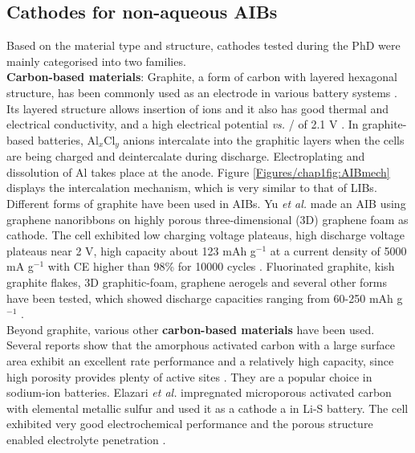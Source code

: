 \subsection{Cathodes for non-aqueous AIBs}
Based on the material type and structure, cathodes tested during the PhD were mainly categorised into two families.\\
\textbf{Carbon-based materials}: Graphite, a form of carbon with layered hexagonal structure, has been commonly used as an electrode in various battery systems \cite{xu_charge-transfer_2007, zhang_novel_2016, wu_carbon_2003, jian_carbon_2015}. Its layered structure allows insertion of ions and it also has good thermal and electrical conductivity, and a high electrical potential \textit{vs.} / of 2.1 V \cite{lin_ultrafast_2015}. In graphite-based batteries, Al$_x$Cl$_y$ anions intercalate into the graphitic layers when the cells are being charged and deintercalate during discharge. Electroplating and dissolution of Al takes place at the anode. Figure \ref{Figures/chap1fig:AIBmech} displays the intercalation mechanism, which is very similar to that of LIBs. Different forms of graphite have been used in AIBs. Yu \textit{et al.} made an AIB using graphene nanoribbons on highly porous three-dimensional (3D) graphene foam as cathode. The cell exhibited low charging voltage plateaus, high discharge voltage plateaus near 2 V, high capacity about 123 mAh g$^{-1}$ at a current density of 5000 mA g$^{-1}$ with CE higher than 98\% for 10000 cycles \cite{yu_graphene_2017}. Fluorinated graphite, kish graphite flakes, 3D graphitic-foam, graphene aerogels and several other forms have been tested, which showed discharge capacities ranging from 60-250 mAh g$^{-1}$ \cite{rani_fluorinated_2013, wang_kish_2017, wu_3d_2016, huang_graphene_2019} . \\
Beyond graphite, various other \textbf{carbon-based materials} have been used. Several reports show that the amorphous activated carbon with a large surface area exhibit an excellent rate performance and a relatively high capacity, since high porosity provides plenty of active sites \cite{tang_hollow_2012, li_commercial_2018}. They are a popular choice in sodium-ion batteries\cite{zhu_high_2016,hou_carbon_2015,cao_sodium_2012}. Elazari \textit{et al.} impregnated microporous activated carbon with elemental metallic sulfur and used it as a cathode a in Li-S battery. The cell exhibited very good electrochemical performance and the porous structure enabled electrolyte penetration \cite{elazari_sulfur-impregnated_2011}.  

